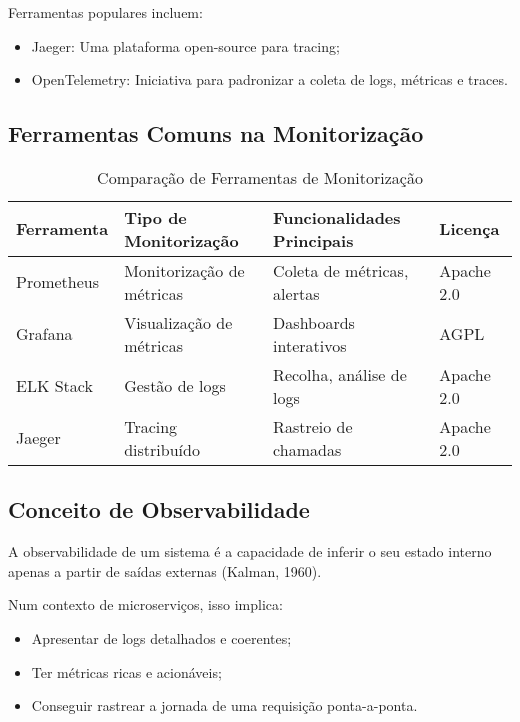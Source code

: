 Ferramentas populares incluem:

\begin{itemize}
    \item Jaeger: Uma plataforma open-source para tracing;
    \item OpenTelemetry: Iniciativa para padronizar a coleta de logs, métricas e traces.
\end{itemize}

\subsection{Ferramentas Comuns na Monitorização }

\begin{table}[H]
\centering
\caption{Comparação de Ferramentas de Monitorização}
\label{tab:comparacao_ferramentas}
\begin{tabular}{|p{3.5cm}|p{3.5cm}|p{5cm}|p{2.5cm}|}
\hline
\textbf{Ferramenta} & \textbf{Tipo de Monitorização} & \textbf{Funcionalidades Principais} & \textbf{Licença} \\
\hline
Prometheus & Monitorização de métricas & Coleta de métricas, alertas & Apache 2.0 \\
\hline
Grafana & Visualização de métricas & Dashboards interativos & AGPL \\
\hline
ELK Stack & Gestão de logs & Recolha, análise de logs & Apache 2.0 \\
\hline
Jaeger & Tracing distribuído & Rastreio de chamadas & Apache 2.0 \\
\hline
\end{tabular}
\end{table}

\subsection{Conceito de Observabilidade}

A observabilidade de um sistema é a capacidade de inferir o seu estado interno apenas a partir de saídas externas (Kalman, 1960).

Num contexto de microserviços, isso implica:

\begin{itemize}
    \item Apresentar de logs detalhados e coerentes;
    \item Ter métricas ricas e acionáveis;
    \item Conseguir rastrear a jornada de uma requisição ponta-a-ponta.
\end{itemize}

